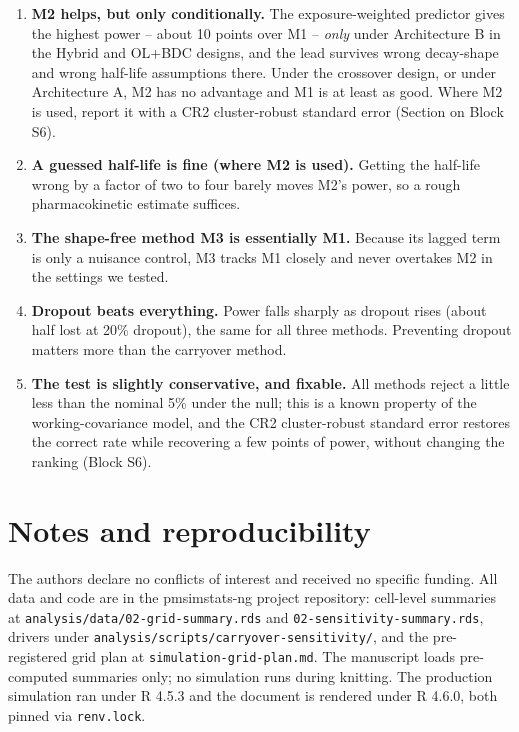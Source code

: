 \documentclass[
  11pt,
]{article}
\begin{document}
\begin{enumerate}
\def\labelenumi{\arabic{enumi}.}
\item
  \textbf{M2 helps, but only conditionally.} The exposure-weighted
  predictor gives the highest power -- about 10 points over M1 --
  \emph{only} under Architecture B in the Hybrid and OL+BDC designs,
  and the lead survives wrong decay-shape and wrong half-life
  assumptions there. Under the crossover design, or under
  Architecture A, M2 has no advantage and M1 is at least as good.
  Where M2 is used, report it with a CR2 cluster-robust standard
  error (Section on Block S6).
\item
  \textbf{A guessed half-life is fine (where M2 is used).} Getting the
  half-life wrong by a factor of two to four barely moves M2's
  power, so a rough pharmacokinetic estimate suffices.
\item
  \textbf{The shape-free method M3 is essentially M1.} Because its
  lagged term is only a nuisance control, M3 tracks M1 closely and
  never overtakes M2 in the settings we tested.
\item
  \textbf{Dropout beats everything.} Power falls sharply as dropout
  rises (about half lost at 20\% dropout), the same for all three
  methods. Preventing dropout matters more than the carryover
  method.
\item
  \textbf{The test is slightly conservative, and fixable.} All methods
  reject a little less than the nominal 5\% under the null; this is
  a known property of the working-covariance model, and the CR2
  cluster-robust standard error restores the correct rate while
  recovering a few points of power, without changing the ranking
  (Block S6).
\end{enumerate}

\section*{Notes and reproducibility}\label{notes-and-reproducibility}

The authors declare no conflicts of interest and received no
specific funding. All data and code are in the pmsimstats-ng
project repository: cell-level summaries at
\texttt{analysis/data/02-grid-summary.rds} and \texttt{02-sensitivity-summary.rds},
drivers under \texttt{analysis/scripts/carryover-sensitivity/}, and the
pre-registered grid plan at \texttt{simulation-grid-plan.md}. The
manuscript loads pre-computed summaries only; no simulation runs
during knitting. The production simulation ran under R 4.5.3 and
the document is rendered under R 4.6.0, both pinned via \texttt{renv.lock}.
\end{document}
